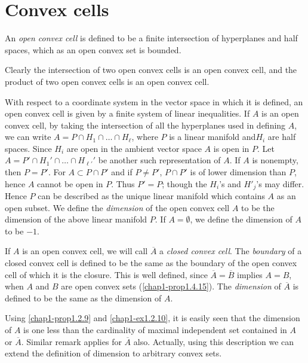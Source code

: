 \section{Convex cells}\label{chap1-sec1.5}

\begin{definition}\label{chap1-defi1.5.1}
An {\em open convex cell} is defined to be a finite intersection of hyperplanes and half spaces, which as an open convex set is bounded.
\end{definition}

Clearly the intersection of two open convex cells is an open convex cell, and the product of two open convex cells is an open convex cell.

With respect to a coordinate system in the vector space in which it is defined, an open convex cell is given by a finite system of linear inequalities. If $A$ is an open convex cell, by taking the intersection of all the hyperplanes used in defining $A$, we can write $A=P\cap H_{1}\cap \ldots\cap H_{\ell}$, where $P$ is a linear manifold and\pageoriginale $H_{i}$ are half spaces. Since $H_{i}$ are open in the ambient vector space $A$ is open in $P$. Let $A=P'\cap H_{1}'\cap\ldots\cap H_{\ell'}'$ be another such representation of $A$. If $A$ is nonempty, then $P=P'$. For $A\subset P\cap P'$
and if $P\neq P'$, $P\cap P'$ is of lower dimension than $P$, hence $A$ cannot be open in $P$. Thus $P'=P$; though the $H_{i}$'s and $H'_{j}$'s may differ. Hence $P$ can be described as the unique linear manifold which contains $A$ as an open subset. We define the {\em dimension} of the open convex cell $A$ to be the dimension of the above linear manifold $P$. If $A=\emptyset$, we define the dimension of $A$ to be $-1$.

If $A$ is an open convex cell, we will call $\overline{A}$ a {\em closed convex cell}. The {\em boundary} of a closed convex cell is defined to be the same as the boundary of the open convex cell of which it is the closure. This is well defined, since $\overline{A}=\overline{B}$ implies $A=B$, when $A$ and $B$ are open convex sets (\ref{chap1-prop1.4.15}). The {\em dimension} of $\overline{A}$ is defined to be the same as the dimension of $A$.

Using \ref{chap1-prop1.2.9} and \ref{chap1-ex1.2.10}, it is easily seen that the dimension of $A$ is one less than the cardinality of maximal independent set contained in $A$ or $\overline{A}$. Similar remark applies for $\overline{A}$ also. Actually, using this description we can extend the definition of dimension to arbitrary convex sets.

